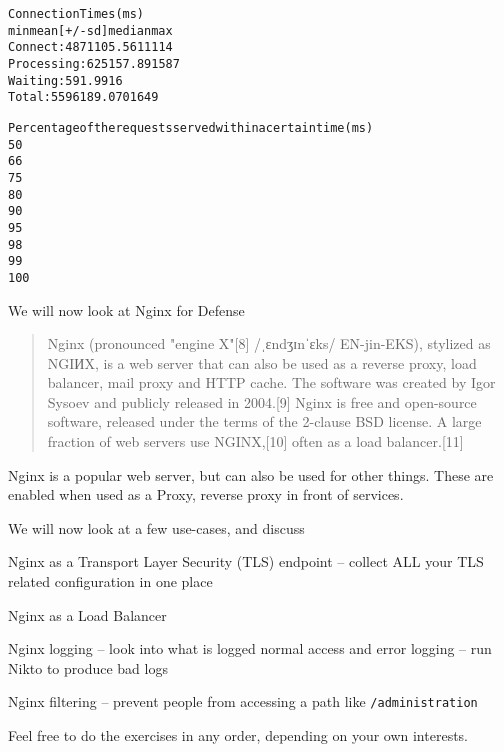 \documentclass[Screen16to9,17pt]{foils}
\begin{document}

\begin{alltt}
\footnotesize
Connection Times (ms)
              min  mean[+/-sd] median   max
Connect:       48   71 105.5     61    1114
Processing:     6   25 157.8      9    1587
Waiting:        5    9   1.9      9      16
Total:         55   96 189.0     70    1649

Percentage of the requests served within a certain time (ms)
  50%     70
  66%     72
  75%     73
  80%     74
  90%     76
  95%     78
  98%   1124
  99%   1649
 100%   1649 (longest request)
\end{alltt}










We will now look at Nginx for Defense






\begin{quote}
Nginx (pronounced "engine X"[8] /ˌɛndʒɪnˈɛks/ EN-jin-EKS), stylized as NGIИX, is a web server that can also be used as a reverse proxy, load balancer, mail proxy and HTTP cache. The software was created by Igor Sysoev and publicly released in 2004.[9] Nginx is free and open-source software, released under the terms of the 2-clause BSD license. A large fraction of web servers use NGINX,[10] often as a load balancer.[11]
\end{quote}

Nginx is a popular web server, but can also be used for other things. These are enabled when used as a Proxy, reverse proxy in front of services.


We will now look at a few use-cases, and discuss
\begin{list2}
\item Nginx as a Transport Layer Security (TLS) endpoint -- collect ALL your TLS related configuration in one place
\item Nginx as a Load Balancer
\item Nginx logging -- look into what is logged normal access and error logging -- run Nikto to produce bad logs
\item Nginx filtering -- prevent people from accessing a path like \verb+/administration+
\end{list2}

Feel free to do the exercises in any order, depending on your own interests.





\slidenext{}
\end{document}
